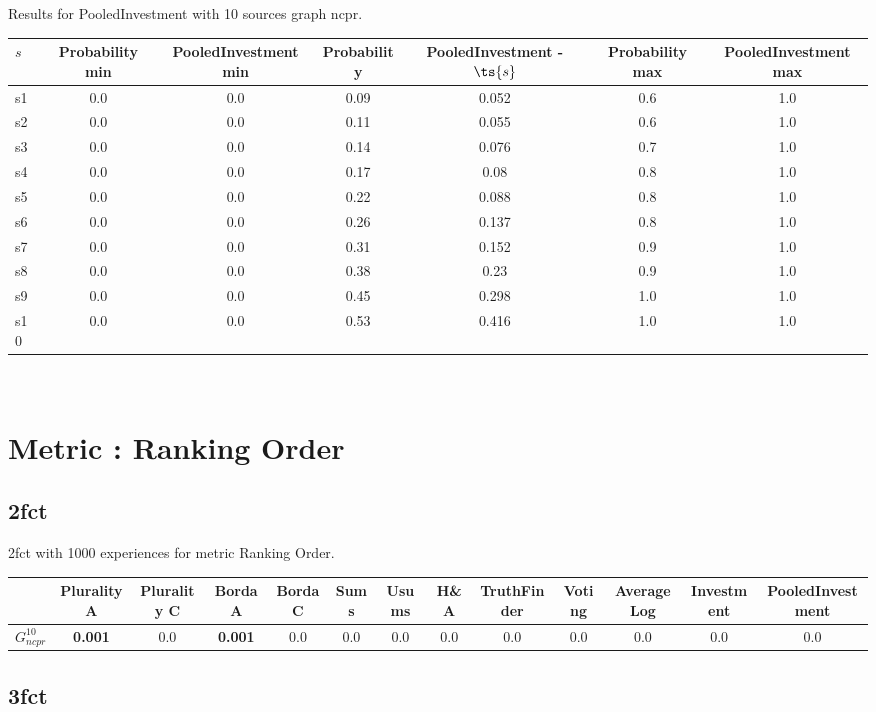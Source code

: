 \documentclass{article}
\newcommand{\graph}[2]{$G_{#1}^{#2}$}
\begin{document}
\noindent Results for PooledInvestment with 10 sources graph ncpr.

\noindent\begin{tabular}{|l|c|c|c|c|c|c|}
\hline
$s$& Probability min & PooledInvestment min & Probability & PooledInvestment - $\ts{s}$ & Probability max & PooledInvestment max\\
\hline
s1 &0.0 & 0.0 & 0.09 & 0.052 & 0.6 & 1.0\\
\hline
s2 &0.0 & 0.0 & 0.11 & 0.055 & 0.6 & 1.0\\
\hline
s3 &0.0 & 0.0 & 0.14 & 0.076 & 0.7 & 1.0\\
\hline
s4 &0.0 & 0.0 & 0.17 & 0.08 & 0.8 & 1.0\\
\hline
s5 &0.0 & 0.0 & 0.22 & 0.088 & 0.8 & 1.0\\
\hline
s6 &0.0 & 0.0 & 0.26 & 0.137 & 0.8 & 1.0\\
\hline
s7 &0.0 & 0.0 & 0.31 & 0.152 & 0.9 & 1.0\\
\hline
s8 &0.0 & 0.0 & 0.38 & 0.23 & 0.9 & 1.0\\
\hline
s9 &0.0 & 0.0 & 0.45 & 0.298 & 1.0 & 1.0\\
\hline
s10 &0.0 & 0.0 & 0.53 & 0.416 & 1.0 & 1.0\\
\hline
\end{tabular}\\

\newpage
\section{Metric : Ranking Order}

\newpage

\subsection{2fct}

2fct with 1000 experiences for metric Ranking Order.

\noindent\begin{tabular}{|l|c|c|c|c|c|c|c|c|c|c|c|c|}
\hline
& Plurality A& Plurality C& Borda A& Borda C& Sums& Usums& H\&A& TruthFinder& Voting& AverageLog& Investment& PooledInvestment\\
\hline
\graph{ncpr}{10} &\textbf{0.001}&0.0&\textbf{0.001}&0.0&0.0&0.0&0.0&0.0&0.0&0.0&0.0&0.0\\
\hline
\end{tabular}
\newpage

\subsection{3fct}
\end{document}
